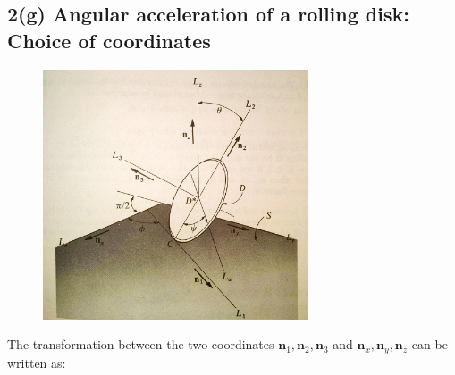 \subsection{2(g) Angular acceleration of a rolling disk: Choice of  coordinates}
\begin{figure}[H]
    \centering
    \includegraphics[width=0.7\textwidth, height=0.5\textwidth]{./figs/ProbSet_2/2_g.jpg}
    \caption{}
    \label{2_g}
\end{figure}
The transformation between the two coordinates $\pmb n_1, \pmb n_2, \pmb n_3$ and $\pmb n_x, \pmb n_y, \pmb n_z$ can be written as:
